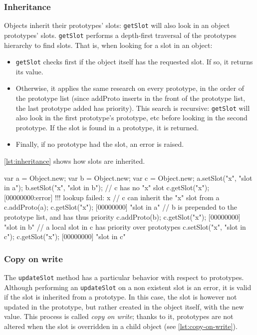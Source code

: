 \subsubsection{Inheritance}

Objects inherit their prototypes' slots: \lstinline|getSlot| will also
look in an object prototypes' slots. \lstinline|getSlot| performs a
depth-first traversal of the prototypes hierarchy to find slots. That
is, when looking for a slot in an object:

\begin{itemize}
\item \lstinline|getSlot| checks first if the object itself has the
  requested slot. If so, it returns its value.
\item Otherwise, it applies the same research on every prototype, in
  the order of the prototype list (since addProto inserts in the front
  of the prototype list, the last prototype added has priority). This
  search is recursive: \lstinline|getSlot| will also look in the first
  prototype's prototype, etc before looking in the second
  prototype. If the slot is found in a prototype, it is returned.
\item Finally, if no prototype had the slot, an error is raised.
\end{itemize}

\autoref{lst:inheritance} shows how slots are inherited.

\begin{urbiscript}[caption=Slots inheritance, label=lst:inheritance,
  float=\floatpos]
  var a = Object.new;
  var b = Object.new;
  var c = Object.new;
  a.setSlot("x", "slot in a");
  b.setSlot("x", "slot in b");
  // c has no "x" slot
  c.getSlot("x");
  [00000000:error] !!! lookup failed: x
  // c can inherit the "x" slot from a
  c.addProto(a);
  c.getSlot("x");
  [00000000] "slot in a"
  // b is prepended to the prototype list, and has thus priority
  c.addProto(b);
  c.getSlot("x");
  [00000000] "slot in b"
  // a local slot in c has priority over prototypes
  c.setSlot("x", "slot in c");
  c.getSlot("x");
  [00000000] "slot in c"
\end{urbiscript}

\subsubsection{Copy on write}

The \lstinline|updateSlot| method has a particular behavior with
respect to prototypes. Although performing an \lstinline|updateSlot|
on a non existent slot is an error, it is valid if the slot is
inherited from a prototype. In this case, the slot is however not
updated in the prototype, but rather created in the object itself,
with the new value. This process is called \emph{copy on write}; thanks
to it, prototypes are not altered when the slot is overridden in a
child object (see \autoref{lst:copy-on-write}).

